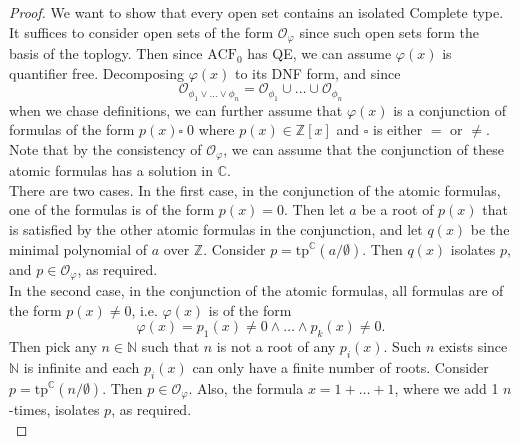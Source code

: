 \documentclass{article}
\begin{document}
\begin{enumerate}[label={\bf Q\arabic*:}]
\begin{proof}
      We want to show that every open set contains an isolated Complete
      type. It suffices to consider open sets of the form
      $\mathcal{O}_\varphi$ since such open sets form the basis of the
      toplogy. Then since $\text{ACF}_0$ has QE, we can assume $\varphi(x)$
      is quantifier free. Decomposing $\varphi(x)$ to its DNF form, and
      since \[\mathcal{O}_{\phi_1\vee\ldots\vee\phi_n} =
      \mathcal{O}_{\phi_1}\cup\ldots\cup\mathcal{O}_{\phi_n}\] when we
      chase definitions, we can further assume that $\varphi(x)$ is a
      conjunction of formulas of the form $p(x)\square\; 0$ where
      $p(x)\in\mathbb{Z}[x]$ and $\square$ is either $=$ or $\neq$. Note
      that by the consistency of $\mathcal{O}_\varphi$, we can assume that
      the conjunction of these atomic formulas has a solution in
      $\mathbb{C}$. \\

      There are two cases. In the first case, in the conjunction of the
      atomic formulas, one of the formulas is of the form $p(x)=0$. Then
      let $a$ be a root of $p(x)$ that is satisfied by the other atomic
      formulas in the conjunction, and let $q(x)$ be the minimal polynomial
      of $a$ over $\mathbb{Z}$. Consider
      $p=\text{tp}^\mathbb{C}(a/\emptyset)$. Then $q(x)$ isolates $p$, and
      $p\in\mathcal{O}_\varphi$, as required. \\

      In the second case, in the conjunction of the atomic formulas, all
      formulas are of the form $p(x)\neq0$, i.e. $\varphi(x)$ is of the
      form \[\varphi(x)=p_1(x)\neq0\wedge\ldots\wedge p_k(x)\neq0.\] Then
      pick any $n\in\mathbb{N}$ such that $n$ is not a root of any
      $p_i(x)$. Such $n$ exists since $\mathbb{N}$ is infinite and each
      $p_i(x)$ can only have a finite number of roots.  Consider
      $p=\text{tp}^\mathbb{C}(n/\emptyset)$. Then
      $p\in\mathcal{O}_\varphi$. Also, the formula $x=1+\ldots+1$, where we
      add 1 $n$-times, isolates $p$, as required. \\
    \end{proof}
\end{enumerate}
\end{document}

